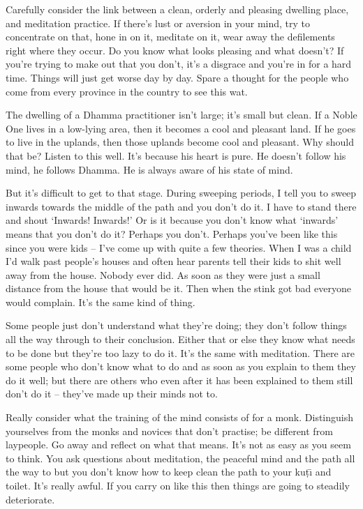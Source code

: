 Carefully consider the link between a clean, orderly and pleasing dwelling place, and meditation practice. If there's lust or aversion in your mind, try to concentrate on that, hone in on it, meditate on it, wear away the defilements right where they occur. Do you know what looks pleasing and what doesn't? If you're trying to make out that you don't, it's a disgrace and you're in for a hard time. Things will just get worse day by day. Spare a thought for the people who come from every province in the country to see this wat.

The dwelling of a Dhamma practitioner isn't large; it's small but clean. If a Noble One lives in a low-lying area, then it becomes a cool and pleasant land. If he goes to live in the uplands, then those uplands become cool and pleasant. Why should that be? Listen to this well. It's because his heart is pure. He doesn't follow his mind, he follows Dhamma. He is always aware of his state of mind.

But it's difficult to get to that stage. During sweeping periods, I tell you to sweep inwards towards the middle of the path and you don't do it. I have to stand there and shout `Inwards! Inwards!' Or is it because you don't know what `inwards' means that you don't do it? Perhaps you don't. Perhaps you've been like this since you were kids -- I've come up with quite a few theories. When I was a child I'd walk past people's houses and often hear parents tell their kids to shit well away from the house. Nobody ever did. As soon as they were just a small distance from the house that would be it. Then when the stink got bad everyone would complain. It's the same kind of thing.

Some people just don't understand what they're doing; they don't follow things all the way through to their conclusion. Either that or else they know what needs to be done but they're too lazy to do it. It's the same with meditation. There are some people who don't know what to do and as soon as you explain to them they do it well; but there are others who even after it has been explained to them still don't do it -- they've made up their minds not to.

Really consider what the training of the mind consists of for a monk. Distinguish yourselves from the monks and novices that don't practise; be different from laypeople. Go away and reflect on what that means. It's not as easy as you seem to think. You ask questions about meditation, the peaceful mind and the path all the way to  but you don't know how to keep clean the path to your ku\d{t}\={\i} and toilet. It's really awful. If you carry on like this then things are going to steadily deteriorate.

